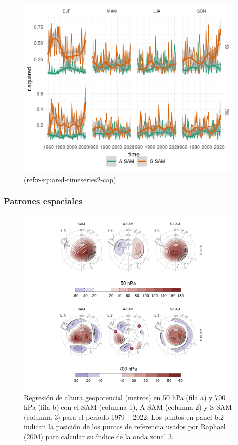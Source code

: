\documentclass[12pt,oneside]{reedthesis}
\begin{document}
\begin{figure}
\includegraphics{figures/30-sam/r-squared-timeseries2-1} \caption{(ref:r-squared-timeseries2-cap)}\label{fig:r-squared-timeseries2}
\end{figure}

\hypertarget{spatial}{%
\subsubsection{Patrones espaciales}\label{spatial}}




\begin{figure}
\includegraphics{figures/30-sam/2d-regr-1} \caption{Regresión de altura geopotencial (metros) en 50 hPa (fila a) y 700 hPa (fila b) con el SAM (columna 1), A-SAM (columna 2) y S-SAM (columna 3) para el período 1979 -- 2022.
Los puntos en panel b.2 indican la posición de los puntos de referencia usados por Raphael (2004) para calcular su índice de la onda zonal 3.}\label{fig:2d-regr}
\end{figure}
\end{document}
